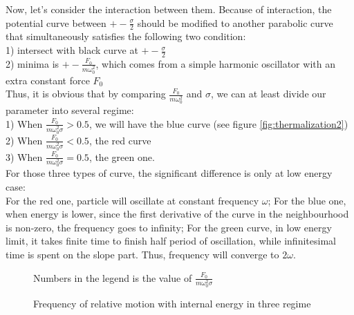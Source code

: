 \documentclass[aps,pre,twocolumn
,groupedaddress]{revtex4-1}
\begin{document}
Now, let's consider the interaction between them. Because of interaction, the potential curve between $+-\frac{\sigma}{2}$ should be modified to another parabolic curve that simultaneously satisfies the following two condition:\\
1) intersect with black curve at $+-\frac{\sigma}{2}$\\
2) minima is $+-\frac{F_0}{m\omega_0^2}$, which comes from a simple harmonic oscillator with an extra constant force $F_0$\\
Thus, it is obvious that by comparing $\frac{F_0}{m\omega_0^2}$ and $\sigma$, we can at least divide our parameter into several regime:\\
1) When $\frac{F_0}{m\omega_0^2\sigma}>0.5$, we will have the blue curve (see figure \ref{fig:thermalization2})\\
2) When $\frac{F_0}{m\omega_0^2\sigma}<0.5$, the red curve\\
3) When $\frac{F_0}{m\omega_0^2\sigma}=0.5$, the green one.\\
For those three types of curve, the significant difference is only at low energy case:\\
For the red one, particle will oscillate at constant frequency $\omega$;
For the blue one, when energy is lower, since the first derivative of the curve in the neighbourhood is non-zero, the frequency goes to infinity;
For the green curve, in low energy limit, it takes finite time to finish half period of oscillation, while infinitesimal time is spent on the slope part. Thus, frequency will converge to  $2\omega$.

\begin{figure}
\centering
\caption{Frequency of relative motion with internal energy in three regime} Numbers in the legend is the value of $\frac{F_0}{m\omega_0^2\sigma}$
\label{fig:thermalization3}
\end{figure}



 
 
\end{document}
